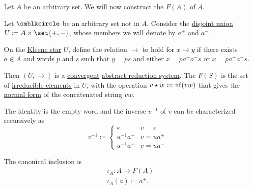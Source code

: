 \begin{definition}\label{def:free_group}
  Let \( A \) be an arbitrary set. We will now construct the  \( F(A) \) of \( A \).

  Let \( \anon \) be an arbitrary set not in \( A \). Consider the \hyperref[def:disjoint_union]{disjoint union} \( U \coloneqq A \times \set{ +, - } \), whose members we will denote by \( a^+ \) and \( a^- \).

  On the \hyperref[def:formal_language/kleene_star]{Kleene star} \( U \), define the relation \( \to \) to hold for \( x \to y \) if there exists \( a \in A \) and words \( p \) and \( s \) such that \( y = ps \) and either \( x = p a^+ a^- s \) or \( x = p a^+ a^- s \).

  Then \( (U, \to) \) is a \hyperref[def:abstract_rewriting_convergence/convergent]{convergent} \hyperref[def:abstract_reduction_system]{abstract reduction system}. The  \( F(S) \) is the set of \hyperref[def:abstract_reduction_system/hierarchy]{irreducible elements} in \( U \), with the operation \( v \star w \coloneqq \operatorname{nf}(vw) \) that gives the \hyperref[def:abstract_reduction_system/normal_form]{normal form} of the concatenated string \( vw \).

  The identity is the empty word and the inverse \( v^{-1} \) of \( v \) can be characterized recursively as
  \begin{equation*}
    v^{-1} \coloneqq \begin{cases}
      \varepsilon &v = \varepsilon \\
      u^{-1} a^-  &v = u a^+ \\
      u^{-1} a^+  &v = u a^-
    \end{cases}
  \end{equation*}

  The canonical inclusion is
  \begin{equation*}
    \begin{aligned}
      &\iota_A: A \to F(A) \\
      &\iota_A(a) \coloneqq a^+.
    \end{aligned}
  \end{equation*}
\end{definition}
